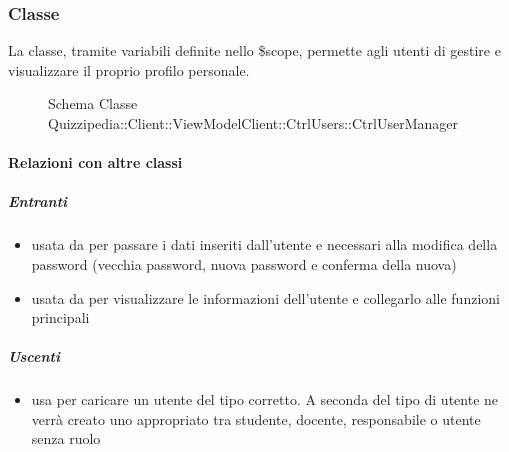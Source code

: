 \subsubsection{Classe }
La classe, tramite variabili definite nello \$scope, permette agli utenti di gestire e visualizzare il proprio profilo personale.
\begin{figure}[H]
\centering
\noindent{}
\caption[Schema Classe CtrlUserManager]{Schema Classe Quizzipedia::Client::ViewModelClient::CtrlUsers::CtrlUserManager}
\end{figure}
\paragraph{Relazioni con altre classi}
\subparagraph{Entranti}
\begin{itemize}
\item usata da  per passare i dati inseriti dall'utente e necessari alla modifica della password (vecchia password, nuova password e conferma della nuova)
\item usata da  per visualizzare le informazioni dell'utente e collegarlo alle funzioni principali
\end{itemize}
\subparagraph{Uscenti}
\begin{itemize}
\item usa  per caricare un utente del tipo corretto. A seconda del tipo di utente ne verrà creato uno appropriato tra studente, docente, responsabile o utente senza ruolo
\end{itemize}
